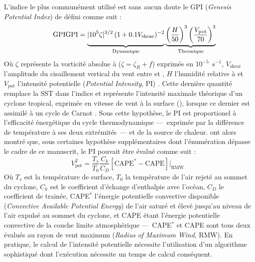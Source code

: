 \documentclass[../main.tex]{subfiles}
\begin{document}
L'indice le plus communément utilisé est sans aucun doute le GPI (\textit{Genesis Potential Index}) de \textcite{emanuel_tropical_2004} défini comme suit :
%
\begin{equation*}
    \tag*{GPI}
    \mathrm{GPI} = \underbrace{\vphantom{\left( \frac{H}{50} \right)^3}\lvert 10^5 \zeta \rvert^{3/2} \, (1 + 0.1 V_{\mathrm{shear}})^{-2}}_{\mathrm{Dynamique}}
    \underbrace{\left( \frac{H}{50} \right)^3 \left( \frac{V_{\mathrm{pot}}}{70} \right)^3}_{\mathrm{Thermique}}
\end{equation*}
%
Où $\zeta$ représente la vorticité absolue à  ($\zeta = \zeta_R + f$) exprimée en 10$^{-5}$~s$^{-1}$, $V_{\mathrm{shear}}$ l'amplitude du cisaillement
vertical du vent entre  et , $H$ l'humidité relative à  et $V_{\mathrm{pot}}$ l'intensité potentielle (\textit{Potential Intensity},
PI) \parencite{emanuel_airsea_1986,emanuel_sensitivity_1995,bister_dissipative_1998,bister_low_2002}. Cette dernière quantité remplace la SST dans l'indice et
représente l'intensité maximale théorique d'un cyclone tropical, exprimée en vitesse de vent à la surface (\ms{}), lorsque ce dernier est assimilé à un cycle de
Carnot \parencite{emanuel_dependence_1987}. Sous cette hypothèse, le PI est proportionel à l'efficacité énergétique du cycle thermodynamique ---~exprimée par la
différence de température à ses deux extrémités~--- et de la source de chaleur. \textcite{bister_low_2002} ont alors montré que, sous certaines hypothèse
supplémentaires dont l'énumération dépasse le cadre de ce manuscrit, le PI pouvait être évalué comme suit :
%
\begin{equation*}
    \tag*{PI}
    V_{\mathrm{pot}}^2 = \frac{T_s}{T_0} \frac{C_k}{C_D} \left[ \mathrm{CAPE}^* - \mathrm{CAPE} \right] \rvert_{\mathrm{RMW}}
\end{equation*}
%
Où $T_s$ est la température de surface, $T_0$ la température de l'air rejeté au sommet du cyclone, $C_k$ est le coefficient d'échange d'enthalpie avec l'océan,
$C_D$ le coefficient de trainée, CAPE$^*$ l'énergie potentielle convective disponible (\textit{Convective Available Potential Energy}) de l'air saturé et élevé
jusqu'au niveau de l'air expulsé au sommet du cyclone, et CAPE étant l'énergie potentielle convective de la couche limite atmosphérique ---~CAPE$^*$ et CAPE
sont tous deux évalués au rayon de vent maximum (\textit{Radius of Maximum Wind}, RMW). En pratique, le calcul de l'intensité potentielle nécessite
l'utilisation d'un algorithme sophistiqué dont l'exécution nécessite un temps de calcul conséquent.
\end{document}
